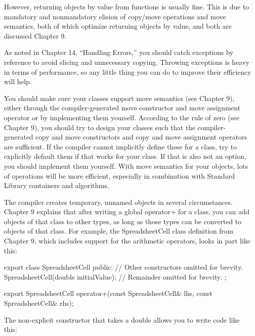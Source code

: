 However, returning objects by value from functions is usually fine. This is due to mandatory and nonmandatory elision of copy/move operations and move semantics, both of which optimize returning objects by value, and both are discussed Chapter 9.


As noted in Chapter 14, “Handling Errors,” you should catch exceptions by reference to avoid slicing and unnecessary copying. Throwing exceptions is heavy in terms of performance, so any little thing you can do to improve their efficiency will help.


You should make sure your classes support move semantics (see Chapter 9), either through the compiler-generated move constructor and move assignment operator or by implementing them yourself. According to the rule of zero (see Chapter 9), you should try to design your classes such that the compiler-generated copy and move constructors and copy and move assignment operators are sufficient. If the compiler cannot implicitly define these for a class, try to explicitly default them if that works for your class. If that is also not an option, you should implement them yourself. With move semantics for your objects, lots of operations will be more efficient, especially in combination with Standard Library containers and algorithms.


The compiler creates temporary, unnamed objects in several circumstances. Chapter 9 explains that after writing a global operator+ for a class, you can add objects of that class to other types, as long as those types can be converted to objects of that class. For example, the SpreadsheetCell class definition from Chapter 9, which includes support for the arithmetic operators, looks in part like this:

\begin{cpp}
export class SpreadsheetCell
{
    public:
        // Other constructors omitted for brevity.
        SpreadsheetCell(double initialValue);
        // Remainder omitted for brevity.
};

export SpreadsheetCell operator+(const SpreadsheetCell& lhs,
    const SpreadsheetCell& rhs);
\end{cpp}

The non-explicit constructor that takes a double allows you to write code like this:


